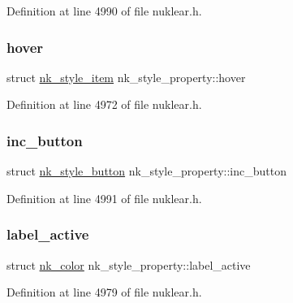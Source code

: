 Definition at line 4990 of file nuklear.\+h.

\mbox{\label{structnk__style__property_af068e57d16d3688ef77454f7ae166a67}} 
\subsubsection{\texorpdfstring{hover}{hover}}
{\footnotesize\ttfamily struct \mbox{\hyperlink{structnk__style__item}{nk\+\_\+style\+\_\+item}} nk\+\_\+style\+\_\+property\+::hover}



Definition at line 4972 of file nuklear.\+h.

\mbox{\label{structnk__style__property_aee8c9b461e7959b29108e1510d95cc09}} 
\subsubsection{\texorpdfstring{inc\+\_\+button}{inc\_button}}
{\footnotesize\ttfamily struct \mbox{\hyperlink{structnk__style__button}{nk\+\_\+style\+\_\+button}} nk\+\_\+style\+\_\+property\+::inc\+\_\+button}



Definition at line 4991 of file nuklear.\+h.

\mbox{\label{structnk__style__property_a9a36437119f317853ceb2f6cddbd9b24}} 
\subsubsection{\texorpdfstring{label\+\_\+active}{label\_active}}
{\footnotesize\ttfamily struct \mbox{\hyperlink{structnk__color}{nk\+\_\+color}} nk\+\_\+style\+\_\+property\+::label\+\_\+active}



Definition at line 4979 of file nuklear.\+h.

